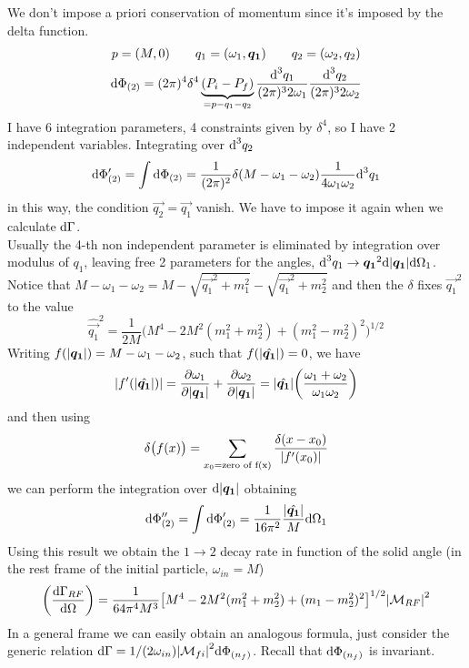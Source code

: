 \documentclass[TheoreticalPhy_ModB.tex]{subfiles}
\begin{document}
\begin{example}[1 $\to$ 2 decay]
We don't impose a priori conservation of momentum since it's imposed by the delta function.
\begin{gather}
p = (M, 0) \qquad
q_1 = (\omega_1, \boldsymbol{q_1}) \qquad
q_2 = (\omega_2, q_2) \notag \\
\textup{d} \Phi_{(2)} = (2 \pi)^4 \delta^4 \underbrace{(P_i - P_f)}_{= p - q_1 - q_2}
	\frac{\textup{d}^3 q_1}{(2 \pi)^3 2 \omega_1} \frac{\textup{d}^3 q_2}{(2 \pi)^3 2 \omega_2} \notag
\end{gather}
I have 6 integration parameters, 4 constraints given by $\delta^4$, so I have 2 independent variables. Integrating over $\textup{d}^3 q_2$
\[
\textup{d} \Phi'_{(2)} = \int \textup{d} \Phi_{(2)} = \frac{1}{(2 \pi)^2} \delta(M - \omega_1 - \omega_2) \frac{1}{4 \omega_1 \omega_2} \textup{d}^3 q_1
\]
in this way, the condition $\vec{q_2} = \vec{q_1}$ vanish. We have to impose it again when we calculate $\textup{d} \Gamma$.\\
Usually the 4-th non independent parameter is eliminated by integration over modulus of $q_1$, leaving free 2 parameters for the angles, $\textup{d}^3 q_1 \to \boldsymbol{q_1}^2 \textup{d} \abs{\boldsymbol{q_1}}\textup{d} \Omega_1$. Notice that $M -\omega_1 - \omega_2 = M - \sqrt{\vec{q_1}^2 + m_1^2} - \sqrt{\vec{q_1}^2 + m_2^2}$ and then the $\delta$ fixes $\vec{q_1}^2$ to the value
\[
\hat{\vec{q_1}}^2 = \frac{1}{2M} \biggl( M^4 - 2M^2(m_1^2 + m_2^2) + (m_1^2 - m_2^2)^2 \biggr)^{1/2}
\]
Writing $f(\abs{\boldsymbol{q_1}})=M-\omega_1-\omega_2$, such that $f(\abs{\hat{\boldsymbol{q_1}}})=0$, we have
\[
\abs{f'(\abs{\hat{\boldsymbol{q_1}}})} = \frac{\partial \omega_1}{\partial \abs{\boldsymbol{q_1}}} 
	+ \frac{\partial \omega_2}{\partial \abs{\boldsymbol{q_1}}} 
	= \abs{\hat{\boldsymbol{q_1}}} \biggl ( \frac{\omega_1 + \omega_2}{\omega_1 \omega_2} \biggr)
\]
and then using
\[
\delta \bigl( f(x) \bigr) = \sum_{x_0 = \textup{zero of f(x)}} \frac{\delta (x - x_0)}{\abs{f'(x_0)}} 
\]
we can perform the integration over $\textup{d} \abs{\boldsymbol{q_1}}$ obtaining
\[
\textup{d} \Phi''_{(2)} = \int \textup{d} \Phi'_{(2)} = \frac{1}{16 \pi^2} \frac{\abs{\hat{\boldsymbol{q_1}}}}{M} \textup{d} \Omega_1
\]
Using this result we obtain the $1 \to 2$ decay rate in function of the solid angle (in the rest frame of the initial particle, $\omega_{in}=M$)
\[
\biggl( \frac{\textup{d} \Gamma_{RF}}{\textup{d} \Omega} \biggr) = \frac{1}{64 \pi^4 M^3}
	\bigl[ M^4 - 2M^2 (m_1^2 + m_2^2) + (m_1 - m_2^2)^2 \bigr]^{1/2} \abs{\mathcal{M}_{RF}}^2
\]
In a general frame we can easily obtain an analogous formula, just consider the generic relation $\textup{d} \Gamma = 1/(2 \omega_{in}) \abs{\mathcal{M}_{fi}}^2 \textup{d} \Phi_{(n_f)}$. Recall that $\textup{d} \Phi_{(n_f)}$ is invariant.


\end{example}
\end{document}

